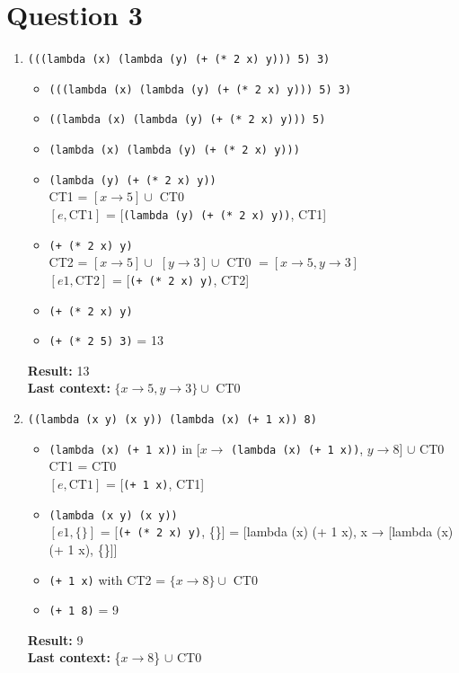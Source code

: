 \documentclass[8pt, letterpaper, titlepage]{article}
\begin{document}
\section*{Question 3}
\begin{enumerate}[label=(\alph*)]
  \item \lstinline|(((lambda (x) (lambda (y) (+ (* 2 x) y))) 5) 3)|
  \begin{itemize}
    \item \lstinline|(((lambda (x) (lambda (y) (+ (* 2 x) y))) 5) 3)|
    \item \lstinline|((lambda (x) (lambda (y) (+ (* 2 x) y))) 5)|
    \item \lstinline|(lambda (x) (lambda (y) (+ (* 2 x) y)))| 
    \item \lstinline|(lambda (y) (+ (* 2 x) y))| \\
    CT1 = $[x \rightarrow 5] \cup$ CT0 \\
    $[e, \text{CT1}]$ = [\lstinline|(lambda (y) (+ (* 2 x) y))|, CT1] 
    \item \lstinline|(+ (* 2 x) y)|  \\
    CT2 = $[x \rightarrow 5] \cup$ $[y \rightarrow 3] \cup$ CT0 $= [x \rightarrow 5, y \rightarrow 3]$ \\
    $[e1, \text{CT2}]$ = [\lstinline|(+ (* 2 x) y)|, CT2] 
    \item \lstinline|(+ (* 2 x) y)|  
    \item \lstinline|(+ (* 2 5) 3)| = 13
  \end{itemize}
  \textbf{Result:} 13 \\
  \textbf{Last context: } $\{x \rightarrow 5, y \rightarrow 3\} \cup$ CT0 \\
  \item \lstinline|((lambda (x y) (x y)) (lambda (x) (+ 1 x)) 8)| \\
  \begin{itemize}
    \item \lstinline|(lambda (x) (+ 1 x))| in [$x \rightarrow$ \lstinline|(lambda (x) (+ 1 x))|, $y \rightarrow 8$] $\cup$ CT0
    CT1 = CT0 \\
    $[e, \text{CT1}]$ = [\lstinline|(+ 1 x)|, CT1] 
    \item \lstinline|(lambda (x y) (x y))| \\
    $[e1, \{\}]$ = [\lstinline|(+ (* 2 x) y)|, \{\}] =  [lambda (x) (+ 1 x), {x → [lambda (x) (+ 1 x), \{\}]}]
    \item \lstinline|(+ 1 x)| with CT2 = $\{x \rightarrow 8\} \cup$ CT0
    \item \lstinline|(+ 1 8)| = 9
  \end{itemize}
  \textbf{Result:} 9 \\
  \textbf{Last context: } \{$x \rightarrow 8$\} $\cup$ CT0
\end{enumerate}
\end{document}
